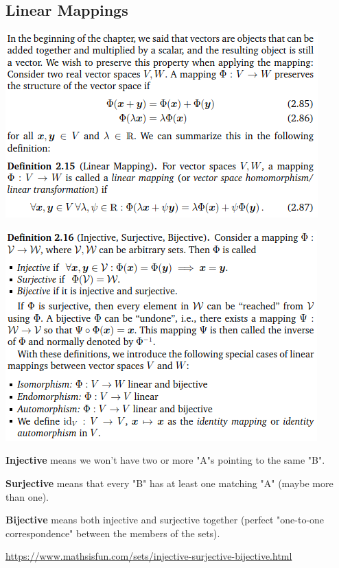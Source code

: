 \documentclass[oneside,10pt]{scrartcl}
\begin{document}
\begin{multicols*}{2}
\subsection{Linear Mappings}
\includegraphics[width=\linewidth]{2.7}

\includegraphics[width=\linewidth]{2.7_1}

\begin{tcolorbox}
\textbf{Injective} means we won't have two or more "A"s pointing to the same "B".

\textbf{Surjective} means that every "B" has at least one matching "A" (maybe more than one). 

\textbf{Bijective} means both injective and surjective together (perfect "one-to-one correspondence" between the members of the sets).

{\tiny \url{https://www.mathsisfun.com/sets/injective-surjective-bijective.html}}
\end{tcolorbox}


\end{multicols*}
\end{document}
